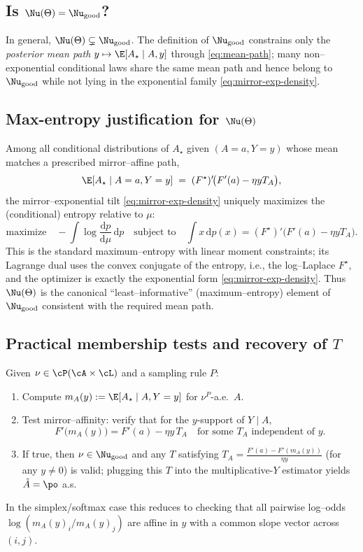 \subsection{Is \texorpdfstring{$\Nu(\Theta)=\Nu_{\text{good}}$}{Nu(Theta)=Nu\_good}?}
In general, $\Nu(\Theta)\subsetneq \Nu_{\text{good}}$. The definition of $\Nu_{\text{good}}$ constrains only the \emph{posterior mean path} $y\mapsto \E[A_\star\mid A,y]$ through \eqref{eq:mean-path}; many non–exponential conditional laws share the same mean path and hence belong to $\Nu_{\text{good}}$ while not lying in the exponential family \eqref{eq:mirror-exp-density}.

\subsection{Max-entropy justification for \texorpdfstring{$\Nu(\Theta)$}{Nu(Theta)}}
Among all conditional distributions of $A_\star$ given $(A=a,Y=y)$ whose mean matches a prescribed mirror–affine path,
\[
    \E[A_\star\mid A=a,Y=y]\;=\;(F^\star)'\!\big(F'(a)-\eta y T_A\big),
\]
the mirror–exponential tilt \eqref{eq:mirror-exp-density} uniquely maximizes the (conditional) entropy relative to $\mu$:
\[
    \text{maximize}\quad -\!\int \log\frac{\mathrm{d}p}{\mathrm{d}\mu}\,\mathrm{d}p
    \quad\text{subject to}\quad
    \int x\,\mathrm{d}p(x)=(F^\star)'\!\big(F'(a)-\eta y T_A\big).
\]
This is the standard maximum–entropy with linear moment constraints; its Lagrange dual uses the convex conjugate of the entropy, i.e., the log–Laplace $F^\star$, and the optimizer is exactly the exponential form \eqref{eq:mirror-exp-density}. Thus $\Nu(\Theta)$ is the canonical ``least–informative'' (maximum–entropy) element of $\Nu_{\text{good}}$ consistent with the required mean path.

\subsection{Practical membership tests and recovery of \texorpdfstring{$T$}{T}}
Given $\nu\in\cP(\cA\times\cL)$ and a sampling rule $P$:
\begin{enumerate}
    \item Compute $m_A(y):= \E[A_\star\mid A, Y=y]$ for $\nu^P$-a.e.\ $A$.
    \item Test mirror–affinity: verify that for the $y$-support of $Y\mid A$,
          \[
              F'\!\big(m_A(y)\big)=F'(a)-\eta y\,T_A
              \quad\text{for some $T_A$ independent of $y$.}
          \]
    \item If true, then $\nu\in\Nu_{\text{good}}$ and any $T$ satisfying
          \(
          T_A = \frac{F'(a)-F'(m_A(y))}{\eta y}
          \)
          (for any $y\neq 0$) is valid; plugging this $T$ into the multiplicative-$Y$ estimator yields $\tilde A=\po$ a.s.
\end{enumerate}
In the simplex/softmax case this reduces to checking that all pairwise log–odds $\log (m_A(y)_i/m_A(y)_j)$ are affine in $y$ with a common slope vector across $(i,j)$.


